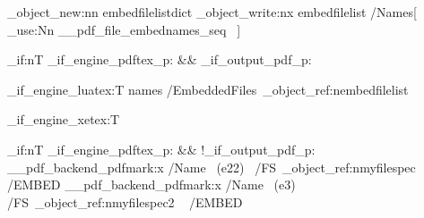 \documentclass{article}
\begin{document}
\pdf_object_new:nn {embedfilelist}{dict}
\pdf_object_write:nx {embedfilelist}
 {
  /Names[ \seq_use:Nn \g__pdf_file_embednames_seq {~}]
 }

\bool_if:nT {\sys_if_engine_pdftex_p: && \sys_if_output_pdf_p:}
 {
 }

\sys_if_engine_luatex:T
 {
   \pdfextension names {/EmbeddedFiles~\pdf_object_ref:n{embedfilelist} }
 }

\sys_if_engine_xetex:T
 {
 }

\bool_if:nT {\sys_if_engine_pdftex_p: && !\sys_if_output_pdf_p:}
 {
   \__pdf_backend_pdfmark:x
     {
       /Name~ (e22)~
       /FS~\pdf_object_ref:n{myfilespec}
       ~ /EMBED
   }
   \__pdf_backend_pdfmark:x
     {
       /Name~ (e3)~
       /FS~\pdf_object_ref:n{myfilespec2}
       ~ /EMBED
   }
  }



\ExplSyntaxOff
\end{document}
